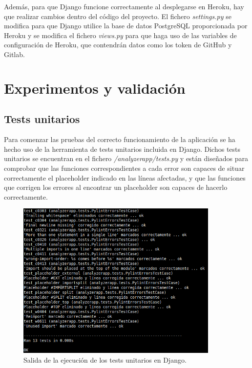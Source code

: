 \documentclass[a4paper, 12pt]{book}
\begin{document}
Además, para que Django funcione correctamente al desplegarse en Heroku, hay que realizar cambios dentro del código del proyecto.
El fichero \textit{settings.py} se modifica para que Django utilice la base de datos PostgreSQL proporcionada por Heroku y se modifica el fichero \textit{views.py} para que haga uso de las variables de configuración de Heroku, que contendrán datos como los token de GitHub y Gitlab.


\cleardoublepage
\chapter{Experimentos y validación}
\label{chap:experimentos}

\section{Tests unitarios}
\label{sec:tests_unitarios}

Para comenzar las pruebas del correcto funcionamiento de la aplicación se ha hecho uso de la herramienta de tests unitarios incluida en Django.
Dichos tests unitarios se encuentran en el fichero \textit{/analyzerapp/tests.py} y están diseñados para comprobar que las funciones correspondientes a cada error son capaces de situar correctamente el placeholder indicado en las líneas afectadas, y que las funciones que corrigen los errores al encontrar un placeholder son capaces de hacerlo correctamente.
\begin{figure}[h]
  \centering
  \includegraphics[width=10cm, keepaspectratio]{img/tests.png}
  \caption{Salida de la ejecución de los tests unitarios en Django.}\label{fig:tests}
\end{figure}
\end{document}
